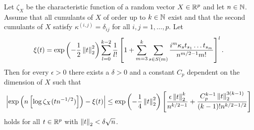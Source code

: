 \begin{theorem}
    Let $\zeta_X$ be the characteristic function of a random vector $X \in {\mathbb{R}^p}$ and let $n \in \mathbb{N}$. Assume that all cumulants of $X$ of order up to $k \in \mathbb{N}$ exist and that the second cumulants of $X$ satisfy $\kappa^{(i, j)} = \delta_{ij}$ for all $i, j = 1, \ldots, p$. Let
    \begin{equation*}
        \xi(t) = \exp\left(-\frac{1}{2}\left\lVert t\right\rVert_2^2\right)\sum_{l=0}^{k-2} \frac{1}{l!} \left[ 1 + \sum_{m=3}^k \sum_{s \in S(m)} \frac{i^m\kappa_s t_{s_1}\ldots t_{s_m}}{n^{m/2-1}m!} \right]^l.
    \end{equation*}
    Then for every $\epsilon > 0$ there exists a $\delta > 0$ and a constant $C_p$ dependent on the dimension of $X$ such that 
    \begin{equation}\label{eq-edge-bound}
        \left|\exp\left(n\left[\log \zeta_X(t n^{-1/2})\right]\right) - \xi(t)\right| \leq \exp\left(-\frac{1}{4}\left\lVert t\right\rVert_2^2\right)\left[ \frac{\epsilon\left\lVert t\right\rVert_2^k}{n^{k/2-1}} + \frac{C_p^{k-1}\left\lVert t\right\rVert_2^{3(k-1)}}{(k-1)!n^{k/2-1/2}} \right]
    \end{equation}
    holds for all $t \in {\mathbb{R}^p}$ with $\left\lVert t\right\rVert_2 < \delta\sqrt{n}$.
\end{theorem}
